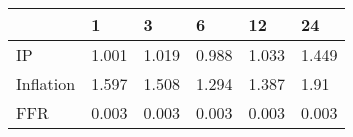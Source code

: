 \begin{tabular}{llllll}
\toprule 
& 1 & 3 & 6 & 12 & 24 \\ 
\midrule 
IP & 1.001 & 1.019 & 0.988 & 1.033 & 1.449 \\ 
Inflation & 1.597 & 1.508 & 1.294 & 1.387 & 1.91 \\ 
FFR & 0.003 & 0.003 & 0.003 & 0.003 & 0.003 \\ 
\bottomrule 
\end{tabular}